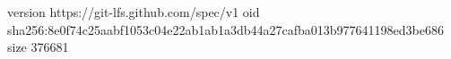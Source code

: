 version https://git-lfs.github.com/spec/v1
oid sha256:8e0f74c25aabf1053c04e22ab1ab1a3db44a27cafba013b977641198ed3be686
size 376681
